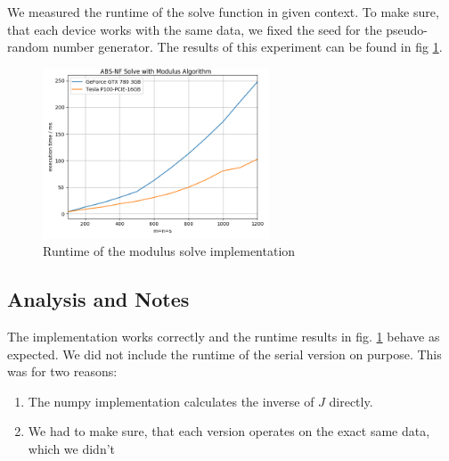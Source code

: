 We measured the runtime of the solve function in given context. To make sure, that each device works with the same data, we fixed the seed for the pseudo-random number generator. The results of this experiment can be found in fig \ref{fig_modulus_runtime}. 

\begin{figure}[ht]
	\centering
	\includegraphics[width=0.6\textwidth]{img/solve_modulus.png}
	\caption{Runtime of the modulus solve implementation}
	\label{fig_modulus_runtime}
\end{figure}

\subsection{Analysis and Notes}
The implementation works correctly and the runtime results in fig. \ref{fig_modulus_runtime} behave as expected. We did not include the runtime of the serial version on purpose. This was for two reasons:
\begin{enumerate}
	\item The numpy implementation calculates the inverse of $J$ directly.
	\item We had to make sure, that each version operates on the exact same data, which we didn't
\end{enumerate}


